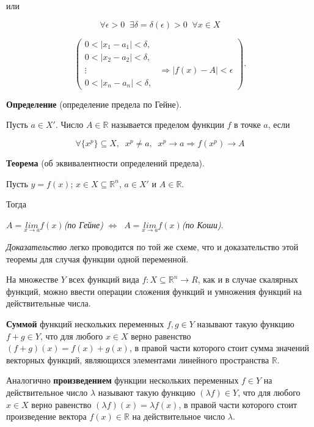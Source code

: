 или 

$$\forall\epsilon>0\;\;\exists\delta=\delta(\epsilon)>0\;\;\forall{x}\in{X}$$

$$
\begin{pmatrix}
0<\vert{x_1-a_1}\vert<\delta, & \; \\
0<\vert{x_2-a_2}\vert<\delta, & \; \\
\vdots & \Rightarrow\vert{f(x)-A}\vert<\epsilon  \\
0<\vert{x_n-a_n}\vert<\delta, & \;
\end{pmatrix}
.$$

\;

\textbf{Определение} (определение предела по Гейне).

Пусть $a\in{X'}$. Число $A\in{\mathbb{R}}$ называется пределом функции $f$ в точке $a$, если

$$\forall\lbrace{x^p}\rbrace\subseteq{X},\;\;x^p\neq{a},\;\;x^p\rightarrow{a}\Rightarrow{f(x^p)\rightarrow{A}}$$

\;

\textbf{Теорема} (об эквивалентности определений предела). 

Пусть $y = f(x)$; $x\in{X}\subseteq\mathbb{R}^n$, $a\in{X'}$ и $A\in\mathbb{R}$.

Тогда

$A=\underset{x\rightarrow{a}}{lim}f(x)$\textit{(по Гейне)} $\Leftrightarrow\;\;A=\underset{x\rightarrow{a}}{lim}f(x)$\textit{(по Коши)}.

\textit{Доказательство} легко проводится по той же схеме, что и доказательство этой теоремы для случая функции одной переменной.

\;

На множестве $Y$ всех функций вида $f:X\subseteq\mathbb{R}^n\rightarrow{R}$, как и в случае скалярных функций, 
можно ввести операции сложения функций и умножения функций на действительные числа.

\textbf{Суммой} функций нескольких переменных $f,g\in{Y}$ называют такую функцию $f+g\in{Y}$, 
что для любого $x\in{X}$ верно равенство $(f+g)(x)=f(x)+g(x)$, в правой части которого стоит сумма значений векторных функций, 
являющихся элементами линейного пространства $\mathbb{R}$. 

Аналогично \textbf{произведением} функции нескольких переменных $f\in{Y}$ на действительное число $\lambda$ 
называют такую функцию $(\lambda{f})\in{Y}$, 
что для любого $x\in{X}$ верно равенство $(\lambda{f})(x)=\lambda{f}(x)$, в правой части которого стоит произведение вектора 
$f(x)\in\mathbb{R}$ на действительное число $\lambda$.